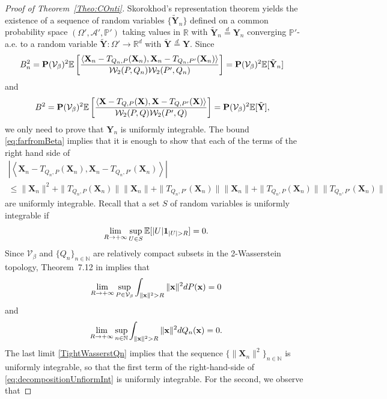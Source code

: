 \documentclass{imsart}
\numberwithin{equation}{section}
\def\N{\mathbb{N}}
\def\R{\mathbb{R}}
\def\E{\mathbb{E}}
\def\x{\mathbf{x}}
\def\X{\mathbf{X}}
\def\Y{\mathbf{Y}}
\def\E{\mathbb E}
\def\N{\mathbb N}
\def\x{\mathbf x}
\begin{document}
\begin{proof}[Proof of Theorem~\ref{Theo:COnti}]
	Skorokhod's representation theorem yields the existence of a sequence of random variables $\{\tilde{\Y}_n\}$ defined on a common probability space $(\Omega', \mathcal{A}',\mathbb{P}')$ taking values in $\R$  with $\tilde{\Y}_n\overset{d}{=}{\Y}_n$ converging $\mathbb{P}'$-a.e. to a random variable  $\tilde{\Y}:\Omega'\to \R^d$ with  $\tilde{\Y}\overset{d}{=} \Y$. 
	Since
	\begin{align*}
		B_n^2&={\bf P}(\mathcal{V}_\beta)^2 {\E\left[  \frac{ \left\langle\X_n-T_{Q_{n} ,P}(\X_n), \X_n-T_{Q_{n} ,P'}(\X_n)  \right\rangle}{\mathcal{W}_2(P,Q_{n}) \mathcal{W}_2(P',Q_{n})}\right] }= {\bf P}(\mathcal{V}_\beta)^2 \E[\tilde{\Y}_n]
	\end{align*}
	and 
	\begin{align*}
		B^2&={\bf P}(\mathcal{V}_\beta)^2 {\E\left[  \frac{ \left\langle \X-T_{Q ,P}(\X), \X-T_{Q ,P'}(\X)  \right\rangle}{\mathcal{W}_2(P,Q) \mathcal{W}_2(P',Q)}\right] }={\bf P}(\mathcal{V}_\beta)^2 \E[\tilde{\Y}],
	\end{align*}
	we only need to prove that $\Y_n$ is uniformly integrable. The bound \eqref{eq:farfromBeta} implies that it is enough to show that each of the terms of the right hand side of 
	\begin{multline}\label{eq:decompositionUnfiormInt}
		|\left\langle\X_n-T_{Q_{n} ,P}(\X_n), \X_n-T_{Q_{n} ,P'}(\X_n)  \right\rangle|\\
		\leq \|\X_n\|^2+ \|T_{Q_{n} ,P}(\X_n)\|\|\X_n\|+\|T_{Q_{n} ,P'}(\X_n)\|\|\X_n\|+\|T_{Q_{n} ,P}(\X_n)\|\|T_{Q_{n} ,P'}(\X_n)\|
	\end{multline}
	are uniformly integrable. Recall that a set $S$ of random variables is uniformly integrable if 
	$$ \lim_{R\to +\infty}\sup_{U\in S}\E[|U|{\bf 1}_{|U|>R}] =0 . $$
	Since $\mathcal{V}_\beta$ and $\{Q_n\}_{n\in \N}$  are relatively compact subsets in the 2-Wasserstein topology, 
	Theorem~7.12 in \cite{villani2003topics} implies that 
	\begin{equation}
		\label{TightWasserst}
		\lim_{R\to +\infty}\sup_{P\in \mathcal{V}_\beta}\int_{{ \| \x\|^2>R}} \|\x\|^2 {\rm d} P(\x) =0
	\end{equation}
	and 
	\begin{equation}
		\label{TightWasserstQn}
		\lim_{R\to +\infty}\sup_{n\in \N}\int_{{ \| \x\|^2>R}} \|\x\|^2 {\rm d} Q_n(\x) =0.
	\end{equation}
	The last limit \eqref{TightWasserstQn} implies that the sequence $\{\|\X_n\|^2\}_{n\in \N}$ is uniformly integrable, so that the first term of  the right-hand-side of \eqref{eq:decompositionUnfiormInt} is uniformly integrable. For the second, we observe that 

\end{proof}
\end{document}
